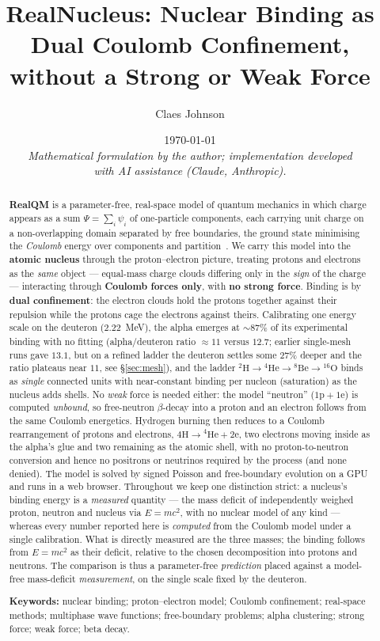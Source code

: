 \documentclass[11pt]{article}
\title{RealNucleus: Nuclear Binding as Dual Coulomb Confinement,\\ without a Strong or Weak Force}
\author[1]{Claes Johnson}
\affil[1]{KTH Royal Institute of Technology, SE-100 44 Stockholm, Sweden \\
\texttt{claesjohnson@gmail.com}}
\date{\today \\[0.4em]
\small\textit{Mathematical formulation by the author; implementation developed} \\
\small\textit{with AI assistance (Claude, Anthropic).}}
\begin{document}
\maketitle

\begin{abstract}
\textbf{RealQM} is a parameter-free, real-space model of quantum mechanics in which charge
appears as a sum $\Psi=\sum_i\psi_i$ of one-particle components, each carrying unit charge on a
non-overlapping domain separated by free boundaries, the ground state minimising the
\emph{Coulomb} energy over components and partition~\cite{Johnson-RealQM,Johnson-Book,Johnson-Atoms}.
We carry this model into the \textbf{atomic nucleus} through the proton--electron picture,
treating protons and electrons as the \emph{same} object --- equal-mass charge clouds
differing only in the \emph{sign} of the charge --- interacting through \textbf{Coulomb forces
only}, with \textbf{no strong force}. Binding is by \textbf{dual confinement}: the electron
clouds hold the protons together against their repulsion while the protons cage the electrons
against theirs. Calibrating one energy scale on the deuteron ($2.22$~MeV), the alpha emerges at
\textbf{${\sim}87\%$} of its experimental binding with no fitting (alpha/deuteron ratio
${\approx}11$ versus $12.7$; earlier single-mesh runs gave $13.1$, but on a refined ladder the
deuteron settles some $27\%$ deeper and the ratio plateaus near $11$, see \S\ref{sec:mesh}), and the ladder $^2\mathrm{H}\to{}^4\mathrm{He}\to{}^8\mathrm{Be}\to{}^{16}\mathrm{O}$
binds as \emph{single} connected units with near-constant binding per nucleon (saturation) as the
nucleus adds shells. No \emph{weak} force is needed either: the model ``neutron''
($\mathrm{1p}+\mathrm{1e}$) is computed \emph{unbound}, so free-neutron $\beta$-decay into a
proton and an electron follows from the same Coulomb energetics. Hydrogen burning then reduces to
a Coulomb rearrangement of protons and electrons, $4\mathrm{H}\to{}^4\mathrm{He}+2\mathrm{e}$, two
electrons moving inside as the alpha's glue and two remaining as the atomic shell, with no
proton-to-neutron conversion and hence no positrons or neutrinos required by the process (and none
denied). The model is solved by signed
Poisson and free-boundary evolution on a GPU and runs in a web browser.
Throughout we keep one distinction strict: a nucleus's binding energy is a \emph{measured}
quantity --- the mass deficit of independently weighed proton, neutron and nucleus via $E=mc^2$,
with no nuclear model of any kind --- whereas every number reported here is \emph{computed} from
the Coulomb model under a single calibration. What is directly measured are the three
masses; the binding follows from $E=mc^2$ as their deficit, relative to the chosen decomposition
into protons and neutrons. The comparison is thus a parameter-free \emph{prediction} placed against
a model-free mass-deficit \emph{measurement}, on the single scale fixed by the deuteron.

\medskip
\noindent\textbf{Keywords:} nuclear binding; proton--electron model; Coulomb confinement;
real-space methods; multiphase wave functions; free-boundary problems; alpha clustering;
strong force; weak force; beta decay.
\end{abstract}
\end{document}
